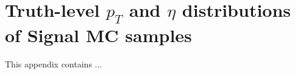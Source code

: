 \clearpage
\section{Truth-level \texorpdfstring{$p_{T}$}{pt} and \texorpdfstring{$\eta$}{eta} distributions of Signal MC samples}
\label{app:signal_truth}
This appendix contains ...
